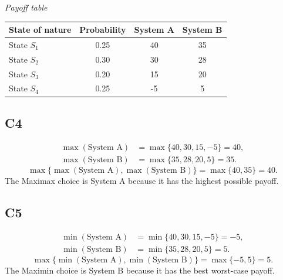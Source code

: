 \begin{ExamProblems}
		\begin{center}
			\textit{Payoff table} \\
			\begin{tabular}{l c c c}
				\toprule
				State of nature & Probability & System A & System B \\
				\midrule
				State $S_1$ & 0.25 & 40 & 35 \\
				State $S_2$ & 0.30 & 30 & 28 \\
				State $S_3$ & 0.20 & 15 & 20 \\
				State $S_4$ & 0.25 & -5 & 5 \\
				\bottomrule
			\end{tabular}
		\end{center}
		
		\subsection*{C4}
		\[
		\begin{aligned}
		\max(\text{System A}) &= \max\{40,30,15,-5\} = 40,\\
		\max(\text{System B}) &= \max\{35,28,20,5\} = 35.
		\end{aligned}
		\]
		\[
		\max\{\max(\text{System A}), \max(\text{System B})\}
		= \max\{40, 35\}
		= 40.
		\]
		The Maximax choice is System A because it has the highest possible payoff.
		
		\subsection*{C5}
		\[
		\begin{aligned}
		\min(\text{System A}) &= \min\{40,30,15,-5\} = -5,\\
		\min(\text{System B}) &= \min\{35,28,20,5\} = 5.
		\end{aligned}
		\]
		\[
		\max\{\min(\text{System A}), \min(\text{System B})\}
		= \max\{-5, 5\}
		= 5.
		\]
		The Maximin choice is System B because it has the best worst-case payoff.
		

\end{ExamProblems}
